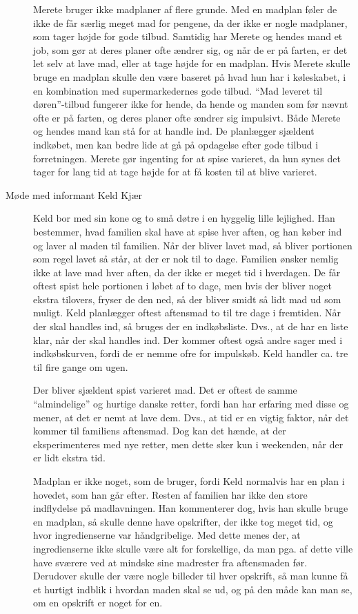 \begin{description}
Merete bruger ikke madplaner af flere grunde. Med en madplan føler de ikke de får særlig meget mad for pengene, da der ikke er nogle madplaner, som tager højde for gode tilbud. Samtidig har Merete og hendes mand et job, som gør at deres planer ofte ændrer sig, og når de er på farten, er det let selv at lave mad, eller at tage højde for en madplan. Hvis Merete skulle bruge en madplan skulle den være baseret på hvad hun har i køleskabet, i en kombination med supermarkedernes gode tilbud. ``Mad leveret til døren''-tilbud fungerer ikke for hende, da hende og manden som før nævnt ofte er på farten, og deres planer ofte ændrer sig impulsivt. Både Merete og hendes mand kan stå for at handle ind. De planlægger sjældent indkøbet, men kan bedre lide at gå på opdagelse efter gode tilbud i forretningen. Merete gør ingenting for at spise varieret, da hun synes det tager for lang tid at tage højde for at få kosten til at blive varieret.

\item[Møde med informant Keld Kjær]

Keld bor med sin kone og to små døtre i en hyggelig lille lejlighed. Han bestemmer, hvad familien skal have at spise hver aften, og han køber ind og laver al maden til familien. Når der bliver lavet mad, så bliver portionen som regel lavet så står, at der er nok til to dage. Familien ønsker nemlig ikke at lave mad hver aften, da der ikke er meget tid i hverdagen. De får oftest spist hele portionen i løbet af to dage, men hvis der bliver noget ekstra tilovers, fryser de den ned, så der bliver smidt så lidt mad ud som muligt. Keld planlægger oftest aftensmad to til tre dage i fremtiden. Når der skal handles ind, så bruges der en indkøbsliste. Dvs., at de har en liste klar, når der skal handles ind. Der kommer oftest også andre sager med i indkøbskurven, fordi de er nemme ofre for impulskøb. Keld handler ca. tre til fire gange om ugen.

Der bliver sjældent spist varieret mad. Det er oftest de samme ``almindelige'' og hurtige danske retter, fordi han har erfaring med disse og mener, at det er nemt at lave dem. Dvs., at tid er en vigtig faktor, når det kommer til familiens aftensmad. Dog kan det hænde, at der eksperimenteres med nye retter, men dette sker kun i weekenden, når der er lidt ekstra tid.

Madplan er ikke noget, som de bruger, fordi Keld normalvis har en plan i hovedet, som han går efter. Resten af familien har ikke den store indflydelse på madlavningen. Han kommenterer dog, hvis han skulle bruge en madplan, så skulle denne have opskrifter, der ikke tog meget tid, og hvor ingredienserne var håndgribelige. Med dette menes der, at ingredienserne ikke skulle være alt for forskellige, da man pga. af dette ville have sværere ved at mindske sine madrester fra aftensmaden før. Derudover skulle der være nogle billeder til hver opskrift, så man kunne få et hurtigt indblik i hvordan maden skal se ud, og på den måde kan man se, om en opskrift er noget for en. 

\end{description}

